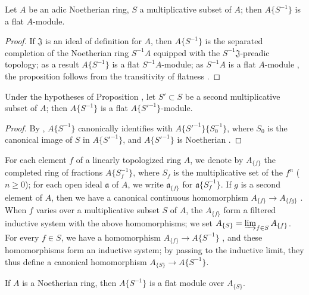 \begin{proposition}[7.6.13]
\label{0.7.6.13}
Let $A$ be an adic Noetherian ring, $S$ a multiplicative subset of $A$; then $A\{S^{-1}\}$ is a
flat $A$-module.
\end{proposition}

\begin{proof}
If $\mathfrak{J}$ is an ideal of definition for $A$, then $A\{S^{-1}\}$ is the separated completion
of the Noetherian ring $S^{-1}A$ equipped with the $S^{-1}\mathfrak{J}$-preadic topology; as a result
 $A\{S^{-1}\}$ is a flat $S^{-1}A$-module; as $S^{-1}A$ is a flat
$A$-module , the proposition follows from the transitivity of flatness .
\end{proof}

\begin{corollary}[7.6.14]
\label{0.7.6.14}
Under the hypotheses of Proposition , let $S'\subset S$ be a second
multiplicative subset of $A$; then $A\{S^{-1}\}$ is a flat $A\{{S'}^{-1}\}$-module.
\end{corollary}

\begin{proof}
By , $A\{S^{-1}\}$ canonically identifies with
$A\{{S'}^{-1}\}\{S_0^{-1}\}$, where $S_0$ is the canonical image of $S$ in $A\{{S'}^{-1}\}$, and
$A\{{S'}^{-1}\}$ is Noetherian .
\end{proof}

\begin{env}[7.6.15]
\label{0.7.6.15}
For each element $f$ of a linearly topologized ring $A$, we denote by $A_{\{f\}}$ the completed
ring of fractions $A\{S_f^{-1}\}$, where $S_f$ is the multiplicative set of the $f^n$
($n\geq 0$); for each open ideal $\mathfrak{a}$ of $A$, we write $\mathfrak{a}_{\{f\}}$ for
$\mathfrak{a}\{S_f^{-1}\}$. If $g$ is a second element of $A$, then we have a canonical continuous
homomorphism $A_{\{f\}}\to A_{\{fg\}}$ . When $f$ varies over a
multiplicative subset $S$ of $A$, the $A_{\{f\}}$ form a filtered inductive system with the above
homomorphisms; we set $A_{\{S\}}=\varinjlim_{f\in S}A_{\{f\}}$. For every $f\in S$, we have a
homomorphism $A_{\{f\}}\to A\{S^{-1}\}$ , and
these homomorphisms form an inductive system; by passing to the inductive limit, they thus define
a canonical homomorphism $A_{\{S\}}\to A\{S^{-1}\}$.
\end{env}

\begin{proposition}[7.6.16]
\label{0.7.6.16}
If $A$ is a Noetherian ring, then $A\{S^{-1}\}$ is a flat module over $A_{\{S\}}$.
\end{proposition}

